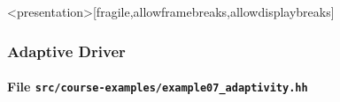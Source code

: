 \begin{frame}<presentation>[fragile,allowframebreaks,allowdisplaybreaks]
  \frametitle<presentation>{Adaptive Driver}
  \framesubtitle<presentation>{File \texttt{src/course-examples/example07\_adaptivity.hh}}
  
\end{frame}

